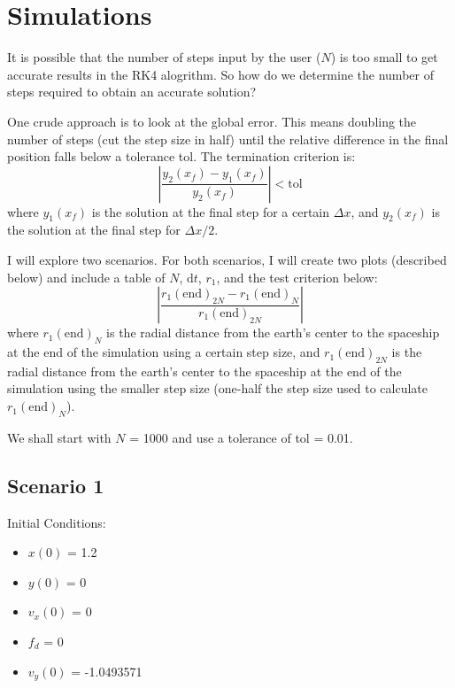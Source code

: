 \section{Simulations}
It is possible that the number of steps input by the user ($N$) is too small to get accurate results in the RK4 alogrithm. So how do we determine the number of steps required to obtain an accurate solution?

\vspace{\baselineskip}

One crude approach is to look at the global error. This means doubling the number of steps (cut the step size in half) until the relative difference in the final position falls below a tolerance tol. The termination criterion is:
\begin{equation*}
    \left|\frac{y_2(x_f) - y_1(x_f)}{y_2(x_f)}\right| < \textrm{tol}
\end{equation*}
where $y_1(x_f)$ is the solution at the final step for a certain $\Delta x$, and $y_2(x_f)$ is the solution at the final step for $\Delta x/2$.

\vspace{\baselineskip}

I will explore two scenarios. For both scenarios, I will create two plots (described below) and include a table of $N$, $\textrm{d}t$, $r_1$, and the test criterion below:
\color{cyan}
\begin{equation*}
    \left|\frac{r_1(\textrm{end})_{2N} - r_1(\textrm{end})_N}{r_1(\textrm{end})_{2N}}\right|
\end{equation*}
\color{white}
where $r_1(\textrm{end})_N$ is the radial distance from the earth’s center to the spaceship at the end of the simulation using a certain step size, and $r_1(\textrm{end})_{2N}$ is the radial distance from the earth’s center to the spaceship at the end of the simulation using the smaller step size (one-half the step size used to calculate $r_1(\textrm{end})_N$).

\vspace{\baselineskip}

We shall start with $N$ = 1000 and use a tolerance of tol = 0.01.

\pagebreak

\subsection{Scenario 1}

Initial Conditions:
\begin{multicols}{4}
    \begin{itemize}
        \item $x(0)$ = 1.2
        \item $y(0)$ = 0
        \item $v_x(0)$ = 0
        \item $f_d$ = 0
        \item $v_y(0)$ = -1.0493571
    \end{itemize}
\end{multicols}

